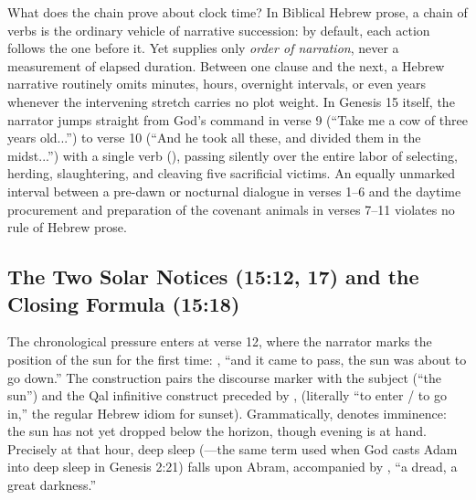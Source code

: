 What does the  chain prove about clock time? In Biblical Hebrew prose, a chain of  verbs is the ordinary vehicle of narrative succession: by default, each action follows the one before it. Yet  supplies only \emph{order of narration}, never a measurement of elapsed duration. Between one  clause and the next, a Hebrew narrative routinely omits minutes, hours, overnight intervals, or even years whenever the intervening stretch carries no plot weight. In Genesis 15 itself, the narrator jumps straight from God's command in verse 9 (``Take me a cow of three years old...'') to verse 10 (``And he took all these, and divided them in the midst...'') with a single  verb (), passing silently over the entire labor of selecting, herding, slaughtering, and cleaving five sacrificial victims. An equally unmarked interval between a pre-dawn or nocturnal dialogue in verses 1--6 and the daytime procurement and preparation of the covenant animals in verses 7--11 violates no rule of Hebrew prose.

\subsection{The Two Solar Notices (15:12, 17) and the Closing Formula (15:18)}

The chronological pressure enters at verse 12, where the narrator marks the position of the sun for the first time: , ``and it came to pass, the sun was about to go down.'' The construction pairs the discourse marker  with the subject  (``the sun'') and the Qal infinitive construct preceded by ,  (literally ``to enter / to go in,'' the regular Hebrew idiom for sunset). Grammatically,  denotes imminence: the sun has not yet dropped below the horizon, though evening is at hand. Precisely at that hour, deep sleep (---the same term used when God casts Adam into deep sleep in Genesis 2:21) falls upon Abram, accompanied by , ``a dread, a great darkness.''


